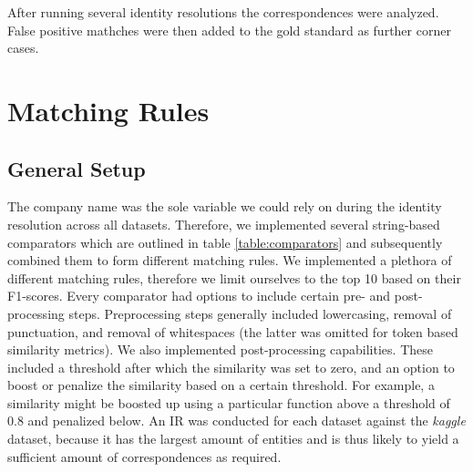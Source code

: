 \documentclass[11pt,titlepage,oneside,openany]{book}
\begin{document}
After running several identity resolutions the correspondences were analyzed. False positive mathches were then added to the gold standard as further corner cases.

\section{Matching Rules}
\label{sec:matching-rules}

\subsection{General Setup}
The company name was the sole variable we could rely on during the identity resolution across all datasets. Therefore, we implemented several string-based comparators which are outlined in table \ref{table:comparators} and subsequently combined them to form different matching rules. We implemented a plethora of different matching rules, therefore we limit ourselves to the top 10 based on their F1-scores.
Every comparator had options to include certain pre- and post-processing steps. Preprocessing steps generally included lowercasing, removal of punctuation, and removal of whitespaces (the latter was omitted for token based similarity metrics). We also implemented post-processing capabilities. These included a threshold after which the similarity was set to zero, and an option to boost or penalize the similarity based on a certain threshold. For example, a similarity might be boosted up using a particular function above a threshold of 0.8 and penalized below. %
An IR was conducted for each dataset against the \textit{kaggle} dataset, because it has the largest amount of entities and is thus likely to yield a sufficient amount of correspondences as required.
\end{document}
